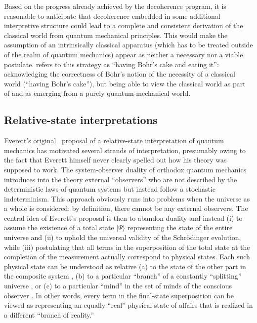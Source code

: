 \documentclass[twocolumn,rmp,aps,amsmath,amsfonts,noshowkeys,noshowpacs]{revtex4}
\newcommand{\ket}[1]{\ensuremath{|{#1\rangle}}}
\begin{document}
Based on the progress already achieved by the decoherence program, it
is reasonable to anticipate that decoherence embedded in some
additional interpretive structure could lead to a complete and
consistent derivation of the classical world from quantum mechanical
principles. This would make the assumption of an intrinsically
classical apparatus (which has to be treated outside of the realm of
quantum mechanics) appear as neither a necessary nor a viable
postulate. \citet[p.~22]{Bacciagaluppi:2003:az} refers to this
strategy as ``having Bohr's cake and eating it'': acknowledging the
correctness of Bohr's notion of the necessity of a classical world
(``having Bohr's cake''), but being able to view the classical world
as part of and as emerging from a purely quantum-mechanical world.


\subsection{Relative-state interpretations \label{sec:everett}}

Everett's original~\citeyearpar{Everett:1957:rw} proposal of a
relative-state interpretation of quantum mechanics has motivated
several strands of interpretation, presumably owing to the fact that
Everett himself never clearly spelled out how his theory was supposed
to work. The system-observer duality of orthodox quantum mechanics
introduces into the theory external ``observers'' who are not
described by the deterministic laws of quantum systems but instead
follow a stochastic indeterminism. This approach obviously runs into
problems when the universe as a whole is considered: by definition,
there cannot be any external observers. The central idea of Everett's
proposal is then to abandon duality and instead (i) to assume the
existence of a total state $\ket{\Psi}$ representing the state of the
entire universe and (ii) to uphold the universal validity of the
Schr\"odinger evolution, while (iii) postulating that all terms in the
superposition of the total state at the completion of the measurement
actually correspond to physical states. Each such physical state can
be understood as relative (a) to the state of the other part in the
composite system \citep[as in Everett's original proposal; also
see][]{Rovelli:1996:rq,Mermin:1998:ii}, (b) to a particular ``branch''
of a constantly ``splitting'' universe \citetext{the {\em many-worlds
    interpretations}, popularized by \citealp{DeWitt:1970:pl} and
  \citealp{Deutsch:1985:rx}}, or (c) to a particular ``mind'' in the
set of minds of the conscious observer \citep[the {\em many-minds
  interpretation}; see, for example,][]{Lockwood:1996:pu}. In other
words, every term in the final-state superposition can be viewed as
representing an equally ``real'' physical state of affairs that is
realized in a different ``branch of reality.''
\end{document}
